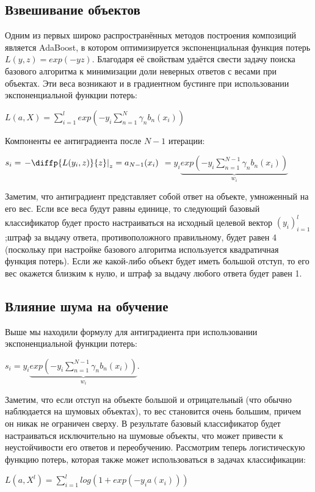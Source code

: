 \documentclass{article}
\theoremstyle{definition}
\theoremstyle{theorem}
\theoremstyle{remark}
\theoremstyle{theorem}
\theoremstyle{example}
\theoremstyle{theorem}
\theoremstyle{theorem}
\theoremstyle{theorem}
\theoremstyle{theorem}
\begin{document}
\subsection{Взвешивание объектов}

Одним из первых широко распространённых методов построения композиций является AdaBoost, в котором оптимизируется экспоненциальная функция потерь $L(y,z)= exp(-yz)$. Благодаря её свойствам удаётся свести задачу поиска базового алгоритма к минимизации доли неверных ответов с весами при объектах. Эти веса возникают и в градиентном бустинге при использовании экспоненциальной функции потерь:

$L(a,X) = \sum_{i=1}^{l} exp\left(-y_i\sum_{n=1}^{N}\gamma_nb_n(x_i)\right)$

Компоненты ее антиградиента после $N-1$ итерации:

$s_i=\left. -\diffp{L(y_i,z)}{z}\right|_z=a_{N-1}(x_i)$ $=y_i\underbrace{exp\left(-y_i\sum_{n=1}^{N-1}\gamma_nb_n(x_i)\right)}_{w_i}$

Заметим, что антиградиент представляет собой ответ на объекте, умноженный на его вес. Если все веса будут равны единице, то следующий базовый классификатор будет просто настраиваться на исходный целевой вектор $(y_i)^l_{i=1}$;штраф за выдачу ответа, противоположного правильному, будет равен 4 (поскольку при настройке базового алгоритма используется квадратичная функция потерь). Если же какой-либо объект будет иметь большой отступ, то его вес окажется близким к нулю, и штраф за выдачу любого ответа будет равен 1.

\subsection{Влияние шума на обучение}

Выше мы находили формулу для антиградиента при использовании экспоненциальной функции потерь:

$s_i=y_i\underbrace{exp\left(-y_i\sum_{n=1}^{N-1}\gamma_nb_n(x_i)\right)}_{w_i}$.

Заметим, что если отступ на объекте большой и отрицательный (что обычно наблюдается на шумовых объектах), то вес становится очень большим, причем он никак не ограничен сверху. В результате базовый классификатор будет настраиваться исключительно на шумовые объекты, что может привести к неустойчивости его ответов и переобучению.
Рассмотрим теперь логистическую функцию потерь, которая также может использоваться в задачах классификации:

$L(a,X^l) = \sum_{i=1}^{l}log(1+exp(-y_ia(x_i)))$
\end{document}
